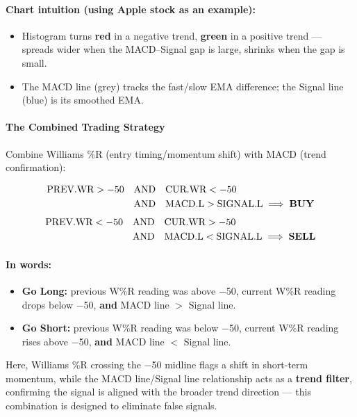 \documentclass[12pt,openany]{book}
\begin{document}
\paragraph{Chart intuition (using Apple stock as an example):}
\begin{itemize}[leftmargin=*]
    \item Histogram turns \textbf{red} in a negative trend, \textbf{green} in a positive trend --- spreads wider when the MACD--Signal gap is large, shrinks when the gap is small.
    \item The MACD line (grey) tracks the fast/slow EMA difference; the Signal line (blue) is its smoothed EMA.
\end{itemize}

\paragraph{The Combined Trading Strategy}

Combine Williams \%R (entry timing/momentum shift) with MACD (trend confirmation):

\[
\begin{aligned}
\text{PREV.WR} > -50 \quad &\text{AND} \quad \text{CUR.WR} < -50 \\
&\text{AND} \quad \text{MACD.L} > \text{SIGNAL.L} \implies \text{\textbf{BUY}}
\end{aligned}
\]
\[
\begin{aligned}
\text{PREV.WR} < -50 \quad &\text{AND} \quad \text{CUR.WR} > -50 \\
&\text{AND} \quad \text{MACD.L} < \text{SIGNAL.L} \implies \text{\textbf{SELL}}
\end{aligned}
\]

\paragraph{In words:}
\begin{itemize}[leftmargin=*]
    \item \textbf{Go Long:} previous W\%R reading was above \(-\)50, current W\%R reading drops below \(-\)50, \textbf{and} MACD line \(>\) Signal line.
    \item \textbf{Go Short:} previous W\%R reading was below \(-\)50, current W\%R reading rises above \(-\)50, \textbf{and} MACD line \(<\) Signal line.
\end{itemize}

Here, Williams \%R crossing the \(-\)50 midline flags a shift in short-term momentum, while the MACD line/Signal line relationship acts as a \textbf{trend filter}, confirming the signal is aligned with the broader trend direction --- this combination is designed to eliminate false signals.
\end{document}
